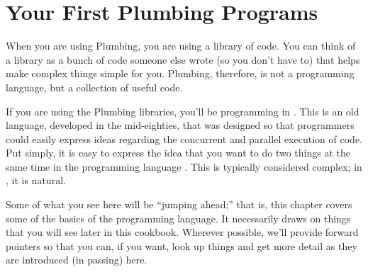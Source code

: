 \chapter{Your First Plumbing Programs\label{ch1}}
When you are using Plumbing, you are using a library of code. You can think of a library as a bunch of code someone else wrote (so you don't have to) that helps make complex things simple for you. Plumbing, therefore, is not a programming language, but a collection of useful code.

If you are using the Plumbing libraries, you'll be programming in \occam. This is an old language, developed in the mid-eighties, that was designed so that programmers could easily express ideas regarding the concurrent and parallel execution of code. Put simply, it is easy to express the idea that you want to do two things at the same time in the programming language \occam. This is typically considered complex; in \occam, it is natural.

Some of what you see here will be ``jumping ahead;'' that is, this chapter covers some of the basics of the \occam programming language. It necessarily draws on things that you will see later in this cookbook. Wherever possible, we'll provide forward pointers so that you can, if you want, look up things and get more detail as they are introduced (in passing) here. 


\newpage


\newpage


\newpage


\newpage


\newpage

